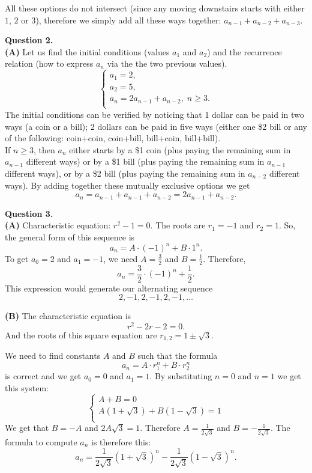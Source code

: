 \documentclass[jou]{apa6}
\begin{document}
All these options do not intersect (since any moving downstairs starts with either $1$, $2$ or $3$), 
therefore we simply add all these ways together: $a_{n-1} + a_{n-2} + a_{n-3}$.



\vspace{10pt} 
{\bf Question 2.}\\
{\bf (A)} Let us find the initial conditions (values $a_1$ and $a_2$) and
the recurrence relation (how to express $a_n$ via the the two previous values).
$$\left\{ \begin{array}{l}
a_1 = 2, \\
a_2 = 5, \\
a_{n} = 2a_{n-1} + a_{n-2},\;n \geq 3.\\
\end{array} \right.$$
The initial conditions can be verified by noticing that 1 dollar can be paid in two ways
(a coin or a bill); 2 dollars can be paid in five ways 
(either one \$2 bill or any of the following: coin+coin, coin+bill, bill+coin, bill+bill).\\
If $n \geq 3$, then $a_n$ either starts by a \$1 coin (plus paying the remaining sum in $a_{n-1}$ different ways)
or by a \$1 bill (plus paying the remaining sum in $a_{n-1}$ different ways), or by 
a \$2 bill (plus paying the remaining sum in $a_{n-2}$ different ways).
By adding together these mutually exclusive options we get
$$a_{n} = a_{n-1} + a_{n-1} + a_{n-2} = 2a_{n-1} + a_{n-2}.$$


\vspace{10pt}
{\bf Question 3.} \\
{\bf (A)} Characteristic equation: $r^2 - 1 = 0$. 
The roots are $r_1 = -1$ and $r_2 = 1$. 
So, the general form of this sequence is 
$$a_n = A \cdot (-1)^n + B \cdot 1^n.$$
To get $a_0 = 2$ and $a_1 = -1$, we need $A = \frac{3}{2}$
and $B = \frac{1}{2}$. Therefore,
$$a_n = \frac{3}{2} \cdot (-1)^n + \frac{1}{2}.$$
This expression would generate our alternating
sequence 
$$2,-1,2,-1,2,-1,\ldots$$

{\bf (B)} The characteristic equation is 
$$r^2 - 2r - 2 = 0.$$
And the roots of this square equation are 
$r_{1,2} = 1 \pm \sqrt{3}$.

We need to find constants $A$ and $B$ such that the formula
$$a_n = A\cdot r_1^n + B\cdot r_2^n$$
is correct and we get $a_0 = 0$ and $a_1 = 1$. 
By substituting $n=0$ and $n=1$ we get this system:
$$\left\{ \begin{array}{l}
A + B = 0\\
A(1 + \sqrt{3}) + B(1 - \sqrt{3}) = 1\\
\end{array} \right.$$
We get that $B = -A$ and $2A\sqrt{3} = 1$. 
Therefore $A = \frac{1}{2\sqrt{3}}$ and 
$B = -\frac{1}{2\sqrt{3}}$. 
The formula to compute $a_n$ is therefore this:
$$a_n = \frac{1}{2\sqrt{3}}\left(1 + \sqrt{3} \right)^n 
-\frac{1}{2\sqrt{3}}\left(1 - \sqrt{3} \right)^n.$$
\end{document}
